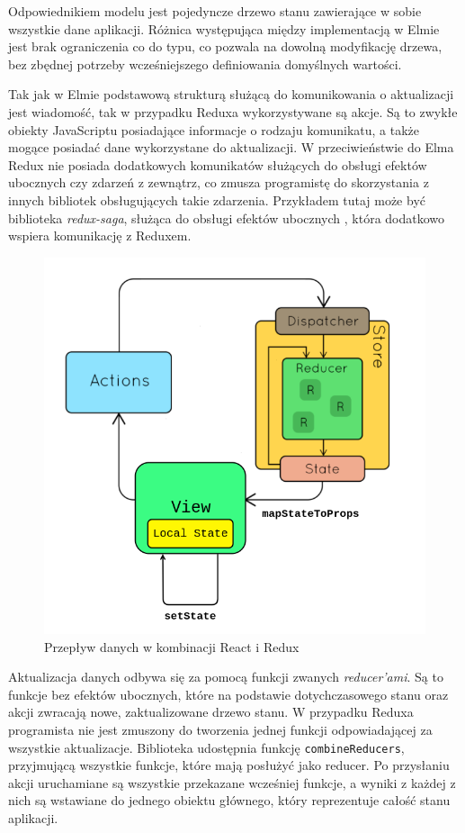 Odpowiednikiem modelu jest pojedyncze drzewo stanu zawierające w sobie wszystkie dane aplikacji. Różnica występująca między implementacją w Elmie jest brak ograniczenia co do typu, co pozwala na dowolną modyfikację drzewa, bez zbędnej potrzeby wcześniejszego definiowania domyślnych wartości. 

Tak jak w Elmie podstawową strukturą służącą do komunikowania o aktualizacji jest wiadomość, tak w przypadku Reduxa wykorzystywane są akcje. Są to zwykłe obiekty JavaScriptu posiadające informacje o rodzaju komunikatu, a także mogące posiadać dane wykorzystane do aktualizacji. W przeciwieństwie do Elma Redux nie posiada dodatkowych komunikatów służących do obsługi efektów ubocznych czy zdarzeń z zewnątrz, co zmusza programistę do skorzystania z innych bibliotek obsługujących takie zdarzenia. Przykładem tutaj może być biblioteka \textit{redux-saga}, służąca do obsługi efektów ubocznych \cite{reduxSaga}, która dodatkowo wspiera komunikację z Reduxem.

\begin{figure}[h]
	\centering
	\includegraphics[height=0.37\textheight]{images/react_redux_data_flow}
	\caption{Przepływ danych w kombinacji React i Redux}
	\label{fig:reactReduxFlow}
\end{figure}
\FloatBarrier


Aktualizacja danych odbywa się za pomocą funkcji zwanych \textit{reducer'ami}. Są to funkcje bez efektów ubocznych, które na podstawie dotychczasowego stanu oraz akcji zwracają nowe, zaktualizowane drzewo stanu. W przypadku Reduxa programista nie jest zmuszony do tworzenia jednej funkcji odpowiadającej za wszystkie aktualizacje. Biblioteka udostępnia funkcję \lstinline{combineReducers}, przyjmującą wszystkie funkcje, które mają posłużyć jako reducer. Po przysłaniu akcji uruchamiane są wszystkie przekazane wcześniej funkcje, a wyniki z każdej z nich są wstawiane do jednego obiektu głównego, który reprezentuje całość stanu aplikacji.

